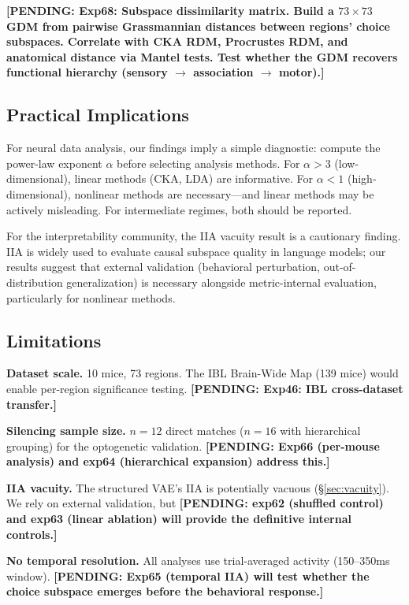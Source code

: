 \documentclass{article}
\newcommand{\pending}[1]{\textcolor{red!70!black}{\textbf{[PENDING: #1]}}}
\begin{document}
\pending{Exp68: Subspace dissimilarity matrix. Build a $73 \times 73$ GDM from pairwise Grassmannian distances between regions' choice subspaces. Correlate with CKA RDM, Procrustes RDM, and anatomical distance via Mantel tests. Test whether the GDM recovers functional hierarchy (sensory $\to$ association $\to$ motor).}

\subsection{Practical Implications}

For neural data analysis, our findings imply a simple diagnostic: compute the power-law exponent $\alpha$ before selecting analysis methods. For $\alpha > 3$ (low-dimensional), linear methods (CKA, LDA) are informative. For $\alpha < 1$ (high-dimensional), nonlinear methods are necessary---and linear methods may be actively misleading. For intermediate regimes, both should be reported.

For the interpretability community, the IIA vacuity result is a cautionary finding. IIA is widely used to evaluate causal subspace quality in language models; our results suggest that external validation (behavioral perturbation, out-of-distribution generalization) is necessary alongside metric-internal evaluation, particularly for nonlinear methods.

\subsection{Limitations}

\textbf{Dataset scale.} 10 mice, 73 regions. The IBL Brain-Wide Map (139 mice) would enable per-region significance testing. \pending{Exp46: IBL cross-dataset transfer.}

\textbf{Silencing sample size.} $n = 12$ direct matches ($n = 16$ with hierarchical grouping) for the optogenetic validation. \pending{Exp66 (per-mouse analysis) and exp64 (hierarchical expansion) address this.}

\textbf{IIA vacuity.} The structured VAE's IIA is potentially vacuous (\S\ref{sec:vacuity}). We rely on external validation, but \pending{exp62 (shuffled control) and exp63 (linear ablation) will provide the definitive internal controls.}

\textbf{No temporal resolution.} All analyses use trial-averaged activity (150--350ms window). \pending{Exp65 (temporal IIA) will test whether the choice subspace emerges before the behavioral response.}
\end{document}

